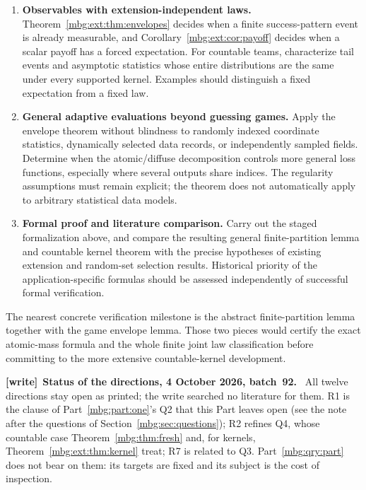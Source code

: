 \documentclass[11pt,letterpaper]{article}
\theoremstyle{definition}
\newenvironment{writenote}[1][]{\par\smallskip\begingroup\small
 \noindent\textbf{[write]}\if\relax\detokenize{#1}\relax\else~\textbf{#1.}\fi\ }%
 {\par\endgroup\smallskip}
\begin{document}
\begin{enumerate}[label=\textbf{R\arabic*.},leftmargin=2.9em,itemsep=0.7em]
\item \textbf{Observables with extension-independent laws.}
Theorem~\ref{mbg:ext:thm:envelopes} decides when a finite success-pattern event is already measurable, and Corollary~\ref{mbg:ext:cor:payoff} decides when a scalar payoff has a forced expectation. For countable teams, characterize tail events and asymptotic statistics whose entire distributions are the same under every supported kernel. Examples should distinguish a fixed expectation from a fixed law.

\item \textbf{General adaptive evaluations beyond guessing games.}
Apply the envelope theorem without blindness to randomly indexed coordinate statistics, dynamically selected data records, or independently sampled fields. Determine when the atomic/diffuse decomposition controls more general loss functions, especially where several outputs share indices. The regularity assumptions must remain explicit; the theorem does not automatically apply to arbitrary statistical data models.

\item \textbf{Formal proof and literature comparison.}
Carry out the staged formalization above, and compare the resulting general finite-partition lemma and countable kernel theorem with the precise hypotheses of existing extension and random-set selection results. Historical priority of the application-specific formulas should be assessed independently of successful formal verification.
\end{enumerate}

The nearest concrete verification milestone is the abstract finite-partition lemma together with the game envelope lemma. Those two pieces would certify the exact atomic-mass formula and the whole finite joint law classification before committing to the more extensive countable-kernel development.

\begin{writenote}[Status of the directions, 4 October 2026, batch~92]
All twelve directions stay open as printed; the write searched no literature for them. R1 is the clause of Part~\ref{mbg:part:one}'s Q2 that this Part leaves open (see the note after the questions of Section~\ref{mbg:sec:questions}); R2 refines Q4, whose countable case Theorem~\ref{mbg:thm:fresh} and, for kernels, Theorem~\ref{mbg:ext:thm:kernel} treat; R7 is related to Q3. Part~\ref{mbg:qry:part} does not bear on them: its targets are fixed and its subject is the cost of inspection.
\end{writenote}
\end{document}
